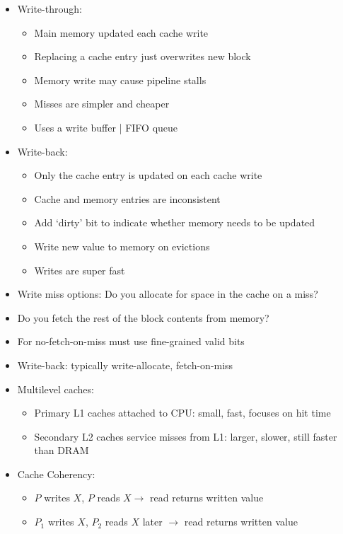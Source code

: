 \documentclass[landscape,10pt]{article}
\begin{document}
\begin{multicols}{4}
\begin{itemize}
\begin{itemize}
    \end{itemize}
    \item[] Write-through:
    \begin{itemize}
        \item[] Main memory updated each cache write
        \item[] Replacing a cache entry just overwrites new block
        \item[] Memory write may cause pipeline stalls
        \item[] Misses are simpler and cheaper
        \item[] Uses a write buffer | FIFO queue
    \end{itemize}
    \item[] Write-back:
    \begin{itemize}
        \item[] Only the cache entry is updated on each cache write
        \item[] Cache and memory entries are inconsistent
        \item[] Add `dirty' bit to indicate whether memory needs to be updated
        \item[] Write new value to memory on evictions
        \item[] Writes are super fast
    \end{itemize}
    \item[] Write miss options: Do you allocate for space in the cache on a miss?
    \item[] Do you fetch the rest of the block contents from memory?
    \item[] For no-fetch-on-miss must use fine-grained valid bits
    \item[] Write-back: typically write-allocate, fetch-on-miss
    \item[] Multilevel caches:
    \begin{itemize}
        \item[] Primary L1 caches attached to CPU: small, fast, focuses on hit time
        \item[] Secondary L2 caches service misses from L1: larger, slower, still faster than DRAM
    \end{itemize}
    \item[] Cache Coherency:
    \begin{itemize}
        \item[] \(P\) writes \(X\), \(P\) reads \(X \rightarrow \) read returns written value
        \item[] \(P_1\) writes \(X\), \(P_2\) reads \(X\) later \(\rightarrow \) read returns written value

\end{itemize}
\end{itemize}
\end{multicols}
\end{document}
